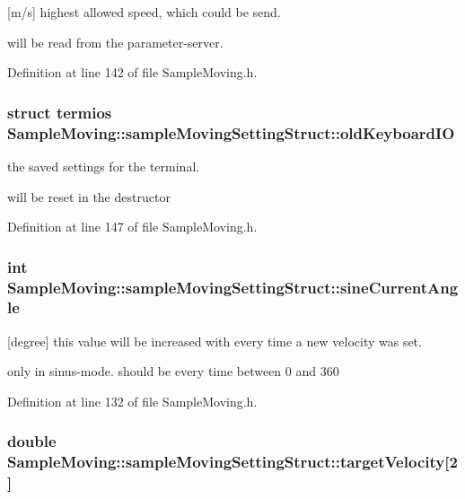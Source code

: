 \mbox{[}m/s\mbox{]} highest allowed speed, which could be send. 

will be read from the parameter-\/server. 

Definition at line 142 of file Sample\-Moving.\-h.

\hypertarget{structSampleMoving_1_1sampleMovingSettingStruct_ada495f188f63cdcfef79f02ed3cce32b}{
\subsubsection[{old\-Keyboard\-I\-O}]{\setlength{\rightskip}{0pt plus 5cm}struct termios Sample\-Moving\-::sample\-Moving\-Setting\-Struct\-::old\-Keyboard\-I\-O}}\label{structSampleMoving_1_1sampleMovingSettingStruct_ada495f188f63cdcfef79f02ed3cce32b}


the saved settings for the terminal. 

will be reset in the destructor 

Definition at line 147 of file Sample\-Moving.\-h.

\hypertarget{structSampleMoving_1_1sampleMovingSettingStruct_afa71f7ba92e0214107179417d59aa7d6}{
\subsubsection[{sine\-Current\-Angle}]{\setlength{\rightskip}{0pt plus 5cm}int Sample\-Moving\-::sample\-Moving\-Setting\-Struct\-::sine\-Current\-Angle}}\label{structSampleMoving_1_1sampleMovingSettingStruct_afa71f7ba92e0214107179417d59aa7d6}


\mbox{[}degree\mbox{]} this value will be increased with every time a new velocity was set. 

only in sinus-\/mode. should be every time between 0 and 360 

Definition at line 132 of file Sample\-Moving.\-h.

\hypertarget{structSampleMoving_1_1sampleMovingSettingStruct_a1fd52fce6a806d0ee764867ab142b255}{
\subsubsection[{target\-Velocity}]{\setlength{\rightskip}{0pt plus 5cm}double Sample\-Moving\-::sample\-Moving\-Setting\-Struct\-::target\-Velocity\mbox{[}2\mbox{]}}}\label{structSampleMoving_1_1sampleMovingSettingStruct_a1fd52fce6a806d0ee764867ab142b255}


